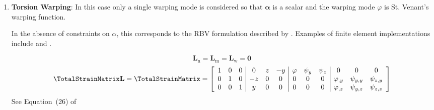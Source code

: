 \begin{enumerate}
\item \textbf{Torsion Warping}: In this case only a single warping mode is considered so that \(\bm{\alpha}\) is a scalar and the warping mode \(\varphi\) is St. Venant's warping function.

In the absence of constraints on \(\alpha\), this corresponds to the RBV formulation described by \cite{armero2021modeling}.
Examples of finite element implementations include \cite{simo1991geometricallyexact} and \cite{gruttmann2000theory}.

$$
  \mathbf{L}_{\mathrm{n}} 
= \mathbf{L}_{\mathrm{m}} 
= \mathbf{L}_{\mathrm{w}} 
= \bm{0}
$$
$$
\TotalStrainMatrix\mathbf{L} = \TotalStrainMatrix = \left[\begin{array}{ccc|ccc|ccc|ccc}
1 & 0 & 0 & 0 & z & - y & \varphi & \psi_{y} & \psi_{z} & 0 & 0 & 0 \\
0 & 1 & 0 & - z & 0 & 0 & 0 & 0 & 0 & \varphi_{,y} & \psi_{y,y} & \psi_{z,y}\\
0 & 0 & 1 & y & 0 & 0 & 0 & 0 & 0 & \varphi_{,z} & \psi_{y,z} & \psi_{z,z}
\end{array}\right]
$$
See Equation~(26) of \cite{dire2018mixed}



\end{enumerate}
